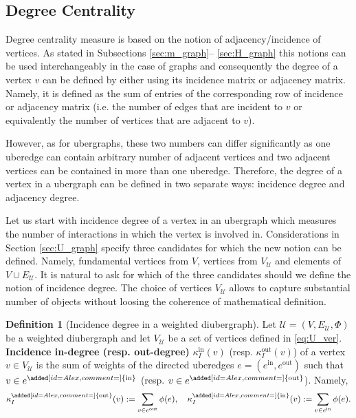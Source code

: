\documentclass[a4paper,12pt]{article}
\theoremstyle{definition}
\newtheorem{definition}{Definition}%
\theoremstyle{remark}
\newcommand{\aadd}[2][]{\added[id=Alex,comment=#1]{#2}}
\newcommand{\al}[1]{\todo[inline,color=cal]{\color{black}#1}}
\newcommand{\mU}{\mathcal{U}}
\newcommand{\tin}{\mathrm{in}} %
\newcommand{\out}{\mathrm{out}}
\begin{document}
\subsection{Degree Centrality}

\al{In my opinion this subsection is ready.}
Degree centrality measure is based on the notion of adjacency/incidence of vertices. As stated in Subsections \ref{sec:m_graph}-- \ref{sec:H_graph} this notions can be used interchangeably in the case of graphs and consequently the degree of a vertex $v$ can be defined by either using its incidence matrix or adjacency matrix. Namely, it is defined as the sum of entries of the corresponding row of incidence or adjacency matrix (i.e. the number of edges that are incident to $v$ or equivalently the number of vertices that are adjacent to $v$).

However, as for ubergraphs, these two numbers can differ significantly as one uberedge can contain arbitrary number of adjacent vertices and two adjacent vertices can be contained in more than one uberedge. Therefore, the degree of a vertex in a ubergraph can be defined in two separate ways: incidence degree and adjacency degree. 

Let us start with incidence degree of a vertex in an ubergraph which measures the number of interactions in which the vertex is involved in. Considerations in Section \ref{sec:U_graph} specify three candidates for which the new notion can be defined. Namely, fundamental vertices from $V$, vertices from $V_{\mU}$ and elements of $V\cup E_{\mU}$. It is natural to ask for which of the three candidates should we define the notion of incidence degree. The choice of vertices $V_{\mU}$ allows to capture substantial number of objects without loosing the coherence of mathematical definition. 
\begin{definition}[Incidence degree in a weighted diubergraph]\label{def:inci_deg}
    Let $\mathcal{U}=(V,E_{\mathcal{U}},\Phi)$ be a weighted diubergraph and let $V_{\mU}$ be a set of vertices defined in \eqref{eq:U_ver}. \textbf{Incidence in-degree (resp. out-degree)} $ \kappa_{I}^{\tin}(v)$ (resp. $ \kappa_{I}^{\out}(v)$) of a vertex $v \in V_{\mU}$ is the sum of weights of the directed uberedges $e=(e^{\mathrm{\tin}}, e^{\mathrm{\out}} )$ such that $v \in e^{\aadd{\tin}}$ (resp. $v \in e^{\aadd{\out}}$). Namely,
    \begin{equation} \label{eq:incidence_deg}
    \kappa_{I}^{\aadd{\out}}(v):=\sum_{v \in e^{\mathrm{\out}} }\phi(e), \quad \kappa_{I}^{\aadd{\tin}}(v):=\sum_{v \in e^{\mathrm{\tin}}}\phi(e).
\end{equation}
\end{definition}
\end{document}
